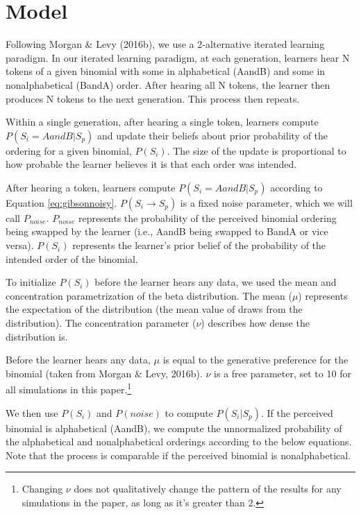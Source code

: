 \documentclass[10pt, letterpaper]{article}
\begin{document}
\hypertarget{model}{%
\section{Model}\label{model}}

Following Morgan \& Levy (2016b), we use a 2-alternative iterated
learning paradigm. In our iterated learning paradigm, at each
generation, learners hear N tokens of a given binomial with some in
alphabetical (AandB) and some in nonalphabetical (BandA) order. After
hearing all N tokens, the learner then produces N tokens to the next
generation. This process then repeats.

Within a single generation, after hearing a single token, learners
compute \(P(S_i = AandB|S_p)\) and update their beliefs about prior
probability of the ordering for a given binomial, \(P(S_i)\). The size
of the update is proportional to how probable the learner believes it is
that each order was intended.

After hearing a token, learners compute \(P(S_i = AandB|S_p)\) according
to Equation \ref{eq:gibsonnoisy}. \(P(S_i \to S_p)\) is a fixed noise
parameter, which we will call \(P_{noise}\). \(P_{noise}\) represents
the probability of the perceived binomial ordering being swapped by the
learner (i.e., AandB being swapped to BandA or vice versa). \(P(S_i)\)
represents the learner's prior belief of the probability of the intended
order of the binomial.

To initialize \(P(S_i)\) before the learner hears any data, we used the
mean and concentration parametrization of the beta distribution. The
mean (\(\mu\)) represents the expectation of the distribution (the mean
value of draws from the distribution). The concentration parameter
(\(\nu\)) describes how dense the distribution is.

Before the learner hears any data, \(\mu\) is equal to the generative
preference for the binomial (taken from Morgan \& Levy, 2016b). \(\nu\)
is a free parameter, set to 10 for all simulations in this
paper.\footnote{Changing \(\nu\) does not qualitatively change the
  pattern of the results for any simulations in the paper, as long as
  it's greater than 2.}

We then use \(P(S_i)\) and \(P(noise)\) to compute \(P(S_i|S_p)\). If
the perceived binomial is alphabetical (AandB), we compute the
unnormalized probability of the alphabetical and nonalphabetical
orderings according to the below equations. Note that the process is
comparable if the perceived binomial is nonalphabetical.
\end{document}
